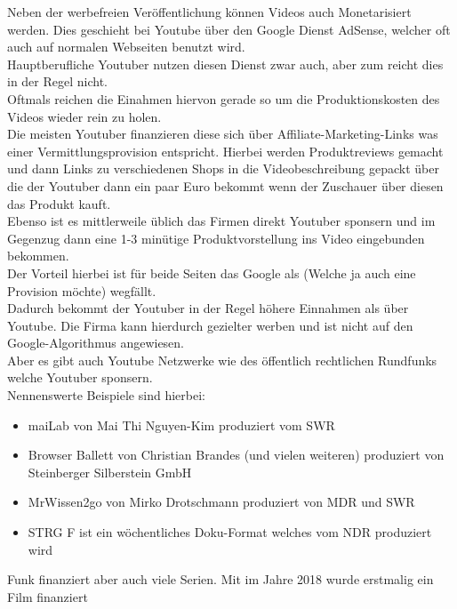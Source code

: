 Neben der werbefreien Veröffentlichung können Videos auch Monetarisiert werden. Dies geschieht bei Youtube über den Google Dienst AdSense, welcher oft auch auf normalen Webseiten benutzt wird. \\
Hauptberufliche Youtuber nutzen diesen Dienst zwar auch, aber zum   reicht dies in der Regel nicht.\\
Oftmals reichen die Einahmen hiervon gerade so um die Produktionskosten des Videos wieder rein zu holen. \\
Die meisten Youtuber finanzieren diese sich über Affiliate-Marketing-Links was einer Vermittlungsprovision entspricht. Hierbei werden Produktreviews gemacht und dann Links zu verschiedenen Shops in die Videobeschreibung gepackt über die der Youtuber dann ein paar Euro bekommt wenn der Zuschauer über diesen das Produkt kauft. \\
Ebenso ist es mittlerweile üblich das Firmen direkt Youtuber sponsern und im Gegenzug dann eine 1-3 minütige Produktvorstellung ins Video eingebunden bekommen.\\
Der Vorteil hierbei ist für beide Seiten das Google als  (Welche ja auch eine Provision möchte) wegfällt. \\
Dadurch bekommt der Youtuber in der Regel höhere Einnahmen als über Youtube. Die Firma kann hierdurch gezielter werben und ist nicht auf den Google-Algorithmus angewiesen.\\

Aber es gibt auch Youtube Netzwerke wie  des öffentlich rechtlichen Rundfunks welche Youtuber sponsern.\\

Nennenswerte Beispiele sind hierbei:
\begin{itemize}
  \item maiLab von Mai Thi Nguyen-Kim produziert vom SWR
  \item Browser Ballett von Christian Brandes (und vielen weiteren) produziert von Steinberger Silberstein GmbH
  \item MrWissen2go von Mirko Drotschmann produziert von MDR und SWR
  \item STRG F ist ein wöchentliches Doku-Format welches vom NDR produziert wird
\end{itemize}


Funk finanziert aber auch viele Serien. Mit  im Jahre 2018 wurde erstmalig ein Film finanziert

